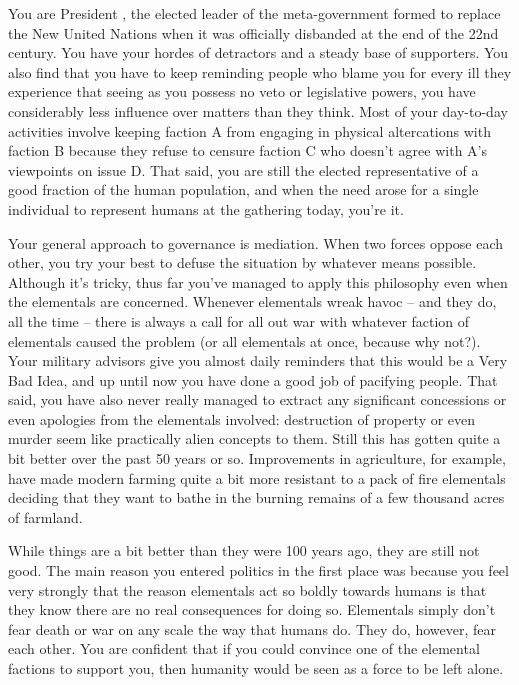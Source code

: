\documentclass[char]{elementals}
\begin{document}
\name{\cLeader{}}

You are President \cLeader{\intro}, the elected leader of the meta-government formed to replace the New United Nations when it was officially disbanded at the end of the 22nd century. You have your hordes of detractors and a steady base of supporters. You also find that you have to keep reminding people who blame you for every ill they experience that seeing as you possess no veto or legislative powers, you have considerably less influence over matters than they think. Most of your day-to-day activities involve keeping faction A from engaging in physical altercations with faction B because they refuse to censure faction C who doesn't agree with A's viewpoints on issue D. That said, you are still the elected representative of a good fraction of the human population, and when the need arose for a single individual to represent humans at the gathering today, you're it.

Your general approach to governance is mediation. When two forces oppose each other, you try your best to defuse the situation by whatever means possible. Although it's tricky, thus far you've managed to apply this philosophy even when the elementals are concerned. Whenever elementals wreak havoc -- and they do, all the time -- there is always a call for all out war with whatever faction of elementals caused the problem (or all elementals at once, because why not?). Your military advisors give you almost daily reminders that this would be a Very Bad Idea, and up until now you have done a good job of pacifying people. That said, you have also never really managed to extract any significant concessions or even apologies from the elementals involved: destruction of property or even murder seem like practically alien concepts to them. Still this has gotten quite a bit better over the past 50 years or so. Improvements in agriculture, for example, have made modern farming quite a bit more resistant to a pack of fire elementals deciding that they want to bathe in the burning remains of a few thousand acres of farmland.

While things are a bit better than they were 100 years ago, they are still not good. The main reason you entered politics in the first place was because you feel very strongly that the reason elementals act so boldly towards humans is that they know there are no real consequences for doing so. Elementals simply don't fear death or war on any scale the way that humans do. They do, however, fear each other. You are confident that if you could convince one of the elemental factions to support you, then humanity would be seen as a force to be left alone.
\end{document}
